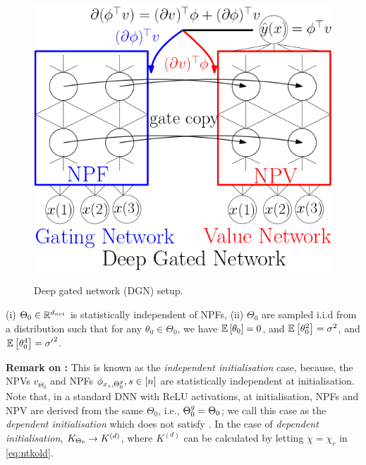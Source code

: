 \begin{figure}[h]
\begin{minipage}{0.29\columnwidth}
{\includegraphics[scale=0.5]{figs/nntwin-blck.png}
}
\end{minipage}
\caption{Deep gated network (DGN) setup.}
\label{fig:dgn}
\end{figure}

\begin{assumption}\label{assmp:main}
(i) $\Theta_0\in\mathbb{R}^{d_{net}}$ is statistically independent of NPFs, (ii) $\Theta_0$ are sampled i.i.d from a distribution such that for any $\theta_0\in\Theta_0$,  we have $\mathbb{E}\left[\theta_0\right]=0$, and  $\mathbb{E}\left[\theta^2_0\right]=\sigma^2$, and $\mathbb{E}\left[\theta^4_0\right]={\sigma'}^2$.
\end{assumption}
\textbf{Remark on :} This is known as the \emph{independent initialisation} case, because, the NPVs $v_{\Theta_0}$ and NPFs $\phi_{x_s,{\Theta}^g_0},s\in[n]$ are statistically independent at initialisation. Note that, in a standard DNN with ReLU activations, at initialisation, NPFs and NPV are derived from the same $\Theta_0$, i.e., ${\Theta}^g_0=\Theta_0$; we call this case as the \emph{dependent initialisation} which does not satisfy . In the case of \emph{dependent initialisation}, $K_{\Theta_0}\rightarrow K^{(d)}$, where $K^{(d)}$ can be calculated by letting $\chi=\chi_{r}$ in \eqref{eq:ntkold}.%

